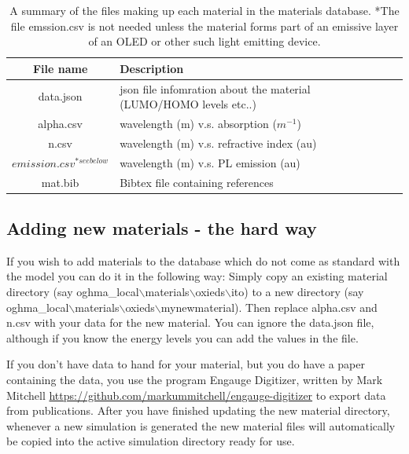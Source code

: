 \begin{table}[H]
\begin{center}
\begin{tabular}{ |c|l|c| } 
 \hline
	File name 			& 	Description  \\ 
 \hline
	data.json			&	json file infomration about the material (LUMO/HOMO levels etc..) \\ 
	alpha.csv			&	wavelength (m) v.s. absorption ($m^{-1}$) \\ 
	n.csv 			&	wavelength (m) v.s. refractive index (au)\\ 
	$emission.csv^{*see below}$ 		&	wavelength (m) v.s. PL emission (au)\\
	mat.bib 			&	Bibtex file containing references\\ 
 \hline
\end{tabular}
\caption{A summary of the files making up each material in the materials database. *The file emssion.csv is not needed unless the material forms part of an emissive layer of an OLED or other such light emitting device.}
\label{tab:db_item_files}
\end{center}
\end{table}
\pagebreak

\subsection{Adding new materials - the hard way}
If you wish to add materials to the database which do not come as standard with the model you can do it in the following way:  Simply copy an existing material directory (say oghma\_local$\backslash$materials$\backslash$oxieds$\backslash$ito) to a new directory (say oghma\_local$\backslash$materials$\backslash$oxieds$\backslash$mynewmaterial).  Then replace alpha.csv and n.csv with your data for the new material. You can ignore the data.json file, although if you know the energy levels you can add the values in the file.

If you don't have data to hand for your material, but you do have a paper containing the data, you use the program Engauge Digitizer, written by  Mark Mitchell \url{https://github.com/markummitchell/engauge-digitizer} to export data from publications.  After you have finished updating the new material directory, whenever a new simulation is generated the new material files will automatically be copied into the active simulation directory ready for use.
\vspace*{\fill}
\pagebreak

